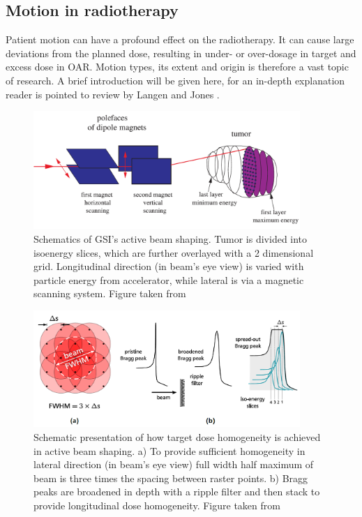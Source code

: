 \subsection{Motion in radiotherapy}
\label{sec:motion}

Patient motion can have a profound effect on the radiotherapy. It can cause large deviations from the planned dose, resulting in under- or over-dosage in target and excess dose in OAR. Motion types, its extent and origin is therefore a vast topic of research. 
A brief introduction will be given here, for an in-depth explanation reader is pointed to review by Langen and Jones \cite{Langen2001}.

\newpage

\vspace*{0.6cm}

\begin{figure}[H]
\begin{center}
\includegraphics[width=0.9\textwidth]{./Fundamentals/Images/therapy.png}
\caption{Schematics of GSI's active beam shaping. Tumor is divided into isoenergy slices, which are further overlayed with a 2 dimensional grid. 
Longitudinal direction (in beam's eye view) is varied with particle energy from accelerator, while lateral is via a magnetic scanning system. Figure taken from \cite{Kraemer2009}}
\label{scanning}
\end{center}
\end{figure}


\begin{figure}[H]
\begin{center}
\includegraphics[width=0.9\textwidth]{./Fundamentals/Images/active.png}
\caption{Schematic presentation of how target dose homogeneity is achieved in active beam shaping. a) To provide sufficient homogeneity in lateral direction (in beam's eye view) full width
half maximum of beam is three times the spacing between raster points. b) Bragg peaks are broadened in depth with a ripple filter and then stack to provide longitudinal dose homogeneity. 
Figure taken from \cite{Richter2012}}
\label{active}
\end{center}
\end{figure}


